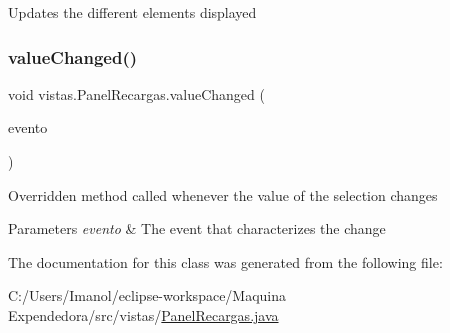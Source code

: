 Updates the different elements displayed \mbox{\label{classvistas_1_1_panel_recargas_af1bcd93b4a920d7cafaf6488af2cb6f4}} 
\subsubsection{\texorpdfstring{value\+Changed()}{valueChanged()}}
{\footnotesize\ttfamily void vistas.\+Panel\+Recargas.\+value\+Changed (\begin{DoxyParamCaption}\item[{List\+Selection\+Event}]{evento }\end{DoxyParamCaption})}

Overridden method called whenever the value of the selection changes 
\begin{DoxyParams}{Parameters}
{\em evento} & The event that characterizes the change \\
\hline
\end{DoxyParams}


The documentation for this class was generated from the following file\+:\begin{DoxyCompactItemize}
\item 
C\+:/\+Users/\+Imanol/eclipse-\/workspace/\+Maquina Expendedora/src/vistas/\mbox{\hyperlink{_panel_recargas_8java}{Panel\+Recargas.\+java}}\end{DoxyCompactItemize}
